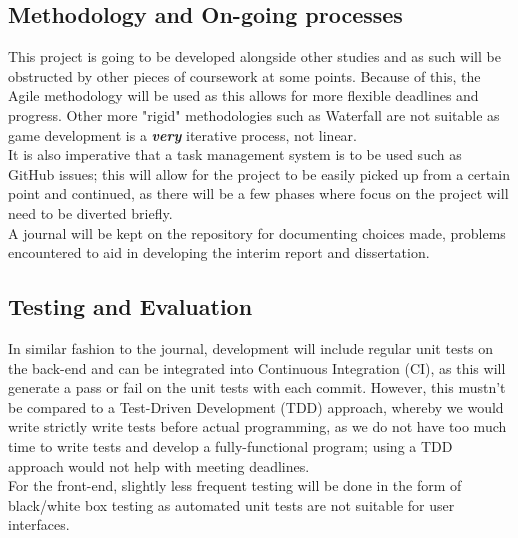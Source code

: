 \documentclass[11pt]{article}
\begin{document}
{\subsection*{Methodology and On-going processes}

This project is going to be developed alongside other studies and as such will be obstructed by other pieces of coursework at some points. Because of this, the Agile methodology will be used as this allows for more flexible deadlines and progress. Other more "rigid" methodologies such as Waterfall are not suitable as game development is a \textbf{\textit{very}} iterative process, not linear. \cite{iterative} \\ 


It is also imperative that a task management system is to be used such as GitHub issues; this will allow for the project to be easily picked up from a certain point and continued, as there will be a few phases where focus on the project will need to be diverted briefly. \\

A journal will be kept on the repository for documenting choices made, problems encountered to aid in developing the interim report and dissertation. \\

\subsection*{Testing and Evaluation}

In similar fashion to the journal, development will include regular unit tests on the back-end and can be integrated into Continuous Integration (CI), as this will generate a pass or fail on the unit tests with each commit. However, this mustn't be compared to a Test-Driven Development (TDD) approach, whereby we would write strictly write tests before actual programming, as we do not have too much time to write tests and develop a fully-functional program; using a TDD approach would not help with meeting deadlines. \cite{tdd_productivity}   \\


For the front-end, slightly less frequent testing will be done in the form of black/white box testing as automated unit tests are not suitable for user interfaces. 

}
\end{document}
